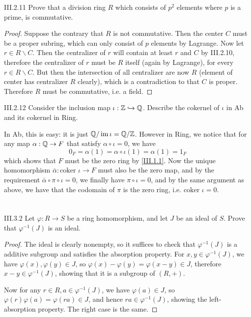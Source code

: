 \begin{problem}{III.2.11}
Prove that a division ring $R$ which consists of $p^2$ elements where $p$ is a prime, is commutative. 
\end{problem}
\begin{proof}
Suppose the contrary that $R$ is not commutative. Then the center $C$ must be a proper subring, which can only consist of $p$ elements by Lagrange. Now let $r \in R \backslash C$. Then the centralizer of $r$ will contain at least $r$ and $C$ by III.2.10, therefore the centralizer of $r$ must be $R$ itself (again by Lagrange), for every $r \in R \backslash C$. But then the intersection of all centralizer are now $R$ (element of center has centralizer $R$ clearly), which is a contradiction to that $C$ is proper. Therefore $R$ must be commutative, i.e. a field.
\end{proof}

\begin{problem}{III.2.12}
Consider the inclusion map $\iota : \mathbb{Z} \xhookrightarrow{} \mathbb{Q}$. Describe the cokernel of $\iota$ in \textsf{Ab} and its cokernel in \textsf{Ring}.
\end{problem}
\begin{solution}
In \textsf{Ab}, this is easy: it is just $\mathbb{Q}/\operatorname{im} \iota = \mathbb{Q} / \mathbb{Z}$. However in \textsf{Ring}, we notice that for any map $\alpha : \mathbb{Q} \to F$ that satisfy $\alpha \circ \iota = 0$, we have
\[
0_F = \alpha (1) = \alpha \circ \iota (1) = \alpha (1) = 1_F  
\] 
which shows that $F$ must be the zero ring by \ref{III.1.1}. Now the unique homomorphism $\bar{\alpha} :\text{coker } \iota \to F$ must also be the zero map, and by the requirement $\bar{\alpha} \circ \pi \circ \iota = 0$, we finally have $\pi \circ \iota = 0$, and by the same argument as above, we have that the codomain of $\pi$ is the zero ring, i.e. $\text{coker } \iota = 0$.
\end{solution}

\section{}

\begin{problem}{III.3.2}
Let $\varphi:R \to S$ be a ring homomorphism, and let $J$ be an ideal of $S$. Prove that $\varphi^{-1}(J)$ is an ideal.
\end{problem}
\begin{proof}
The ideal is clearly nonempty, so it suffices to check that $\varphi^{-1}(J)$ is a additive subgroup and satisfies the absorption property. For $x, y \in \varphi^{-1}(J)$, we have $\varphi(x), \varphi(y) \in J$, so $\varphi(x)-\varphi(y) = \varphi(x-y) \in J$, therefore $x-y \in \varphi^{-1}(J)$, showing that it is a subgroup of $(R,+)$.

Now for any $r \in R, a \in \varphi^{-1}(J)$, we have $\varphi(a) \in J$, so $\varphi(r)\varphi(a) = \varphi(ra) \in J$, and hence $ra \in \varphi^{-1}(J)$, showing the left-absorption property. The right case is the same.
\end{proof}

